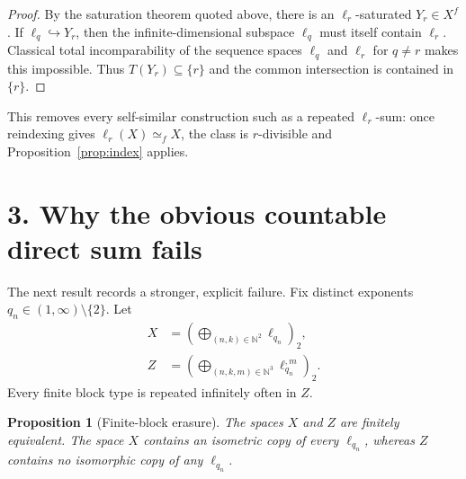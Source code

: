 \documentclass[11pt]{article}
\newtheorem{proposition}{Proposition}
\newcommand{\N}{\mathbb N}
\begin{document}
\begin{proof}
By the saturation theorem quoted above, there is an
$\ell_r$-saturated $Y_r\in X^f$.  If
$\ell_q\hookrightarrow Y_r$, then the infinite-dimensional subspace
$\ell_q$ must itself contain $\ell_r$.  Classical total incomparability of
the sequence spaces $\ell_q$ and $\ell_r$ for $q\ne r$ makes this impossible.
Thus $T(Y_r)\subseteq\{r\}$ and the common intersection is contained in
$\{r\}$.

\end{proof}

This removes every self-similar construction such as a repeated
$\ell_r$-sum: once reindexing gives $\ell_r(X)\simeq_f X$, the class is
$r$-divisible and Proposition~\ref{prop:index} applies.

\section*{3. Why the obvious countable direct sum fails}

The next result records a stronger, explicit failure.  Fix distinct
exponents $q_n\in(1,\infty)\setminus\{2\}$.  Let
\begin{align*}
 X&=\left(\bigoplus_{(n,k)\in\N^2}\ell_{q_n}\right)_{\!2},\\
 Z&=\left(\bigoplus_{(n,k,m)\in\N^3}\ell_{q_n}^{,m}\right)_{\!2}.
\end{align*}
Every finite block type is repeated infinitely often in $Z$.

\begin{proposition}[Finite-block erasure]\label{prop:erase}
The spaces $X$ and $Z$ are finitely equivalent.  The space $X$ contains an
isometric copy of every $\ell_{q_n}$, whereas $Z$ contains no isomorphic copy
of any $\ell_{q_n}$.
\end{proposition}
\end{document}
